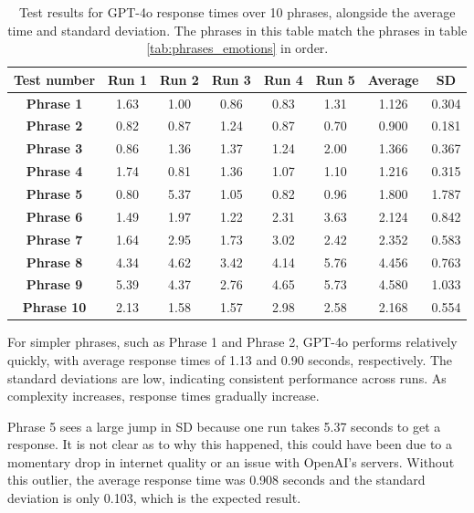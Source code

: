 \begin{table}[h!]
\centering{}
\caption{Test results for GPT-4o response times over 10 phrases, alongside the average time and standard deviation. The phrases in this table match the phrases in table \ref{tab:phrases_emotions} in order.}
\begin{tabular}{|c|c|c|c|c|c|c|c|}
\hline
\textbf{Test number} & \textbf{Run 1} & \textbf{Run 2} & \textbf{Run 3} & \textbf{Run 4} & \textbf{Run 5} & \textbf{Average} & \textbf{SD} \\ \hline
\textbf{Phrase 1} & 1.63 & 1.00 & 0.86 & 0.83 & 1.31 & 1.126 & 0.304          \\ \hline
\textbf{Phrase 2} & 0.82 & 0.87 & 1.24 & 0.87 & 0.70 & 0.900 & 0.181          \\ \hline
\textbf{Phrase 3} & 0.86 & 1.36 & 1.37 & 1.24 & 2.00 & 1.366 & 0.367          \\ \hline
\textbf{Phrase 4} & 1.74 & 0.81 & 1.36 & 1.07 & 1.10 & 1.216 & 0.315          \\ \hline
\textbf{Phrase 5} & 0.80 & 5.37 & 1.05 & 0.82 & 0.96 & 1.800 & 1.787          \\ \hline
\textbf{Phrase 6} & 1.49 & 1.97 & 1.22 & 2.31 & 3.63 & 2.124 & 0.842          \\ \hline
\textbf{Phrase 7} & 1.64 & 2.95 & 1.73 & 3.02 & 2.42 & 2.352 & 0.583          \\ \hline
\textbf{Phrase 8} & 4.34 & 4.62 & 3.42 & 4.14 & 5.76 & 4.456 & 0.763          \\ \hline
\textbf{Phrase 9} & 5.39 & 4.37 & 2.76 & 4.65 & 5.73 & 4.580 & 1.033          \\ \hline
\textbf{Phrase 10}& 2.13 & 1.58 & 1.57 & 2.98 & 2.58 & 2.168 & 0.554          \\ \hline
\end{tabular}
\label{tab:phrase_gpt4o}
\end{table}

For simpler phrases, such as Phrase 1 and Phrase 2, GPT-4o performs relatively quickly, with average response times of 1.13 and 0.90 seconds, respectively. The standard deviations are low, indicating consistent performance across runs. As complexity increases, response times gradually increase.

Phrase 5 sees a large jump in SD because one run takes 5.37 seconds to get a response. It is not clear as to why this happened, this could have been due to a momentary drop in internet quality or an issue with OpenAI's servers. Without this outlier, the average response time was 0.908 seconds and the standard deviation is only 0.103, which is the expected result.

